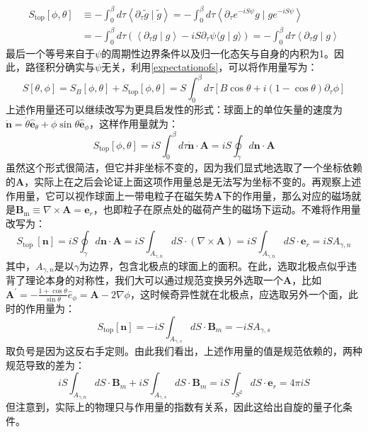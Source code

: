 \documentclass[10pt,openany]{book}
\theoremstyle{thmstyle} %
\theoremstyle{defstyle} %
\theoremstyle{prostyle} %
\begin{document}
\begin{equation}
	\begin{aligned}
		S_{\mathrm{top}}[\phi, \theta] & \equiv-\int_0^\beta d \tau\left\langle\partial_\tau \tilde{g} \mid \tilde{g}\right\rangle=-\int_0^\beta d \tau\left\langle\partial_\tau e^{-i S \psi} g \mid g e^{-i S \psi}\right\rangle \\
		& =-\int_0^\beta d \tau\left(\left\langle\partial_\tau g \mid g\right\rangle-i S \partial_\tau \psi\langle g \mid g\rangle\right)=-\int_0^\beta d \tau\left\langle\partial_\tau g \mid g\right\rangle
		\end{aligned}
\end{equation} 
最后一个等号来自于$ \psi $的周期性边界条件以及归一化态矢与自身的内积为1。因此，路径积分确实与$ \psi $无关，利用\eqref{expectationofs}，可以将作用量写为：
\begin{equation}
	S[\theta, \phi]=S_B[\phi, \theta]+S_{\mathrm{top}}[\phi, \theta]=S \int_0^\beta d \tau\left[B \cos \theta+i(1-\cos \theta) \partial_\tau \phi\right]
\end{equation} 
上述作用量还可以继续改写为更具启发性的形式：球面上的单位矢量的速度为$ \dot{\mathbf{n}}=\dot{\theta} \hat{\mathbf{e}}_\theta+\dot{\phi} \sin \theta \hat{\mathbf{e}}_\phi $，这样作用量就为：
\begin{equation}
	S_{\mathrm{top}}[\phi, \theta]=i S \int_0^\beta d \tau \dot{\mathbf{n}} \cdot \mathbf{A}=i S \oint_\gamma d \mathbf{n} \cdot \mathbf{A}
\end{equation}
虽然这个形式很简洁，但它并非坐标不变的，因为我们显式地选取了一个坐标依赖的$ \mathbf{A} $，实际上在之后会论证上面这项作用量总是无法写为坐标不变的。再观察上述作用量，它可以视作球面上一带电粒子在磁矢势$ \mathbf{A} $下的作用量，那么对应的磁场就是$ \mathbf{B}_{\mathrm{m}} \equiv \nabla \times \mathbf{A}=\mathbf{e}_r $，也即粒子在原点处的磁荷产生的磁场下运动。不难将作用量改写为：
\begin{equation}
	S_{\text {top }}[\mathbf{n}]=i S \oint_\gamma d \mathbf{n} \cdot \mathbf{A}=i S \int_{A_{\gamma, n}} d S \cdot(\nabla \times \mathbf{A})=i S \int_{A_{\gamma, n}} d S \cdot \mathbf{e}_r=i S A_{\gamma, n}
\end{equation}    
其中，$ A_{\gamma, n} $是以$ \gamma $为边界，包含北极点的球面上的面积。在此，选取北极点似乎违背了理论本身的对称性，我们大可以通过规范变换另外选取一个$ \mathbf{A} $，比如$ \mathbf{A}^{\prime}=-\frac{1+\cos \theta}{\sin \theta} \hat{e}_\phi=\mathbf{A}-2 \nabla \phi $，这时候奇异性就在北极点，应选取另外一个面，此时的作用量为：
\begin{equation}
	S_{\mathrm{top}}[\mathbf{n}]=-i S \int_{A_{\gamma, s}} d S \cdot \mathbf{B}_m=-i S A_{\gamma, s}
\end{equation}
取负号是因为这反右手定则。由此我们看出，上述作用量的值是规范依赖的，两种规范导致的差为：
\begin{equation}
	i S \int_{A_{\gamma, n}} d S \cdot \mathbf{B}_m+i S \int_{A_{\gamma, s}} d S \cdot \mathbf{B}_m=i S \int_{S^2} d S \cdot \mathbf{e}_r=4 \pi i S
\end{equation}
但注意到，实际上的物理只与作用量的指数有关系，因此这给出自旋的量子化条件。
\end{document}

